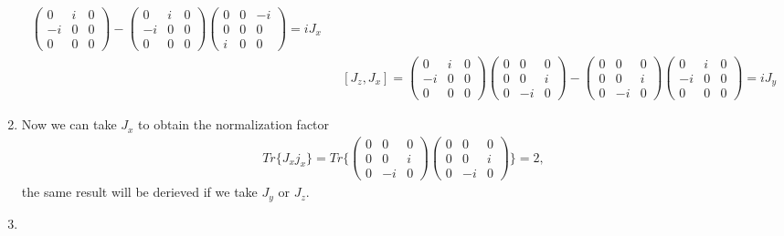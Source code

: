 \documentclass[11pt]{article}
\begin{document}
\begin{enumerate}
\begin{eqnarray}
\begin{pmatrix}
            0&i&0\\
            -i&0&0\\
            0&0&0
        \end{pmatrix} 
        -
        \begin{pmatrix}
            0&i&0\\
            -i&0&0\\
            0&0&0
        \end{pmatrix} 
        \begin{pmatrix}
            0&0&-i\\
            0&0&0\\
            i&0&0
        \end{pmatrix}
        =i J_x \\
        &&[ J_z, J_x ] = 
        \begin{pmatrix}
            0&i&0\\
            -i&0&0\\
            0&0&0
        \end{pmatrix} 
        \begin{pmatrix}
            0&0&0\\
            0&0&i\\
            0&-i&0
        \end{pmatrix}
        -
        \begin{pmatrix}
            0&0&0\\
            0&0&i\\
            0&-i&0
        \end{pmatrix}
        \begin{pmatrix}
            0&i&0\\
            -i&0&0\\
            0&0&0
        \end{pmatrix}
        =i J_y
    \end{eqnarray}

    \item
    Now we can take $J_x$ to obtain the normalization factor
    \begin{eqnarray}
        Tr\{ J_x j_x\} = Tr\{ 
            \begin{pmatrix}
                0&0&0\\
                0&0&i\\
                0&-i&0
            \end{pmatrix}
            \begin{pmatrix}
                0&0&0\\
                0&0&i\\
                0&-i&0
            \end{pmatrix}
            \} =2,
    \end{eqnarray}
    the same result will be derieved if we take $J_y$ or $J_z$.
    \item 
 

\end{enumerate}
\end{document}
